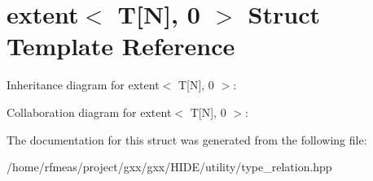 \hypertarget{structextent_3_01T[N]_00_010_01_4}{}\section{extent$<$ T\mbox{[}N\mbox{]}, 0 $>$ Struct Template Reference}
\label{structextent_3_01T[N]_00_010_01_4}


Inheritance diagram for extent$<$ T\mbox{[}N\mbox{]}, 0 $>$\+:


Collaboration diagram for extent$<$ T\mbox{[}N\mbox{]}, 0 $>$\+:


The documentation for this struct was generated from the following file\+:\begin{DoxyCompactItemize}
\item 
/home/rfmeas/project/gxx/gxx/\+H\+I\+D\+E/utility/type\+\_\+relation.\+hpp\end{DoxyCompactItemize}
